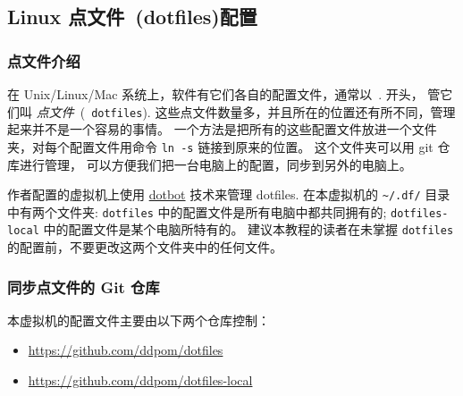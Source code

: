 \documentclass[
    11pt,
    base=hide,
    cite=authoryear,
    device=phone,
    lang=cn,
    mode=simple,
    result=answer,
    toc=onecol,
]{elegantbook_sierxue}
\begin{document}


\subsection{Linux 点文件~(dotfiles)配置}%
\label{sub:dotfiles-settings}

\subsubsection{点文件介绍}%
\label{ssub:dotfiles-settings-intro}

在 Unix/Linux/Mac 系统上，软件有它们各自的配置文件，通常以~. 开头，
管它们叫 \emph{点文件}~(~\texttt{dotfiles}).
这些点文件数量多，并且所在的位置还有所不同，管理起来并不是一个容易的事情。
一个方法是把所有的这些配置文件放进一个文件夹，对每个配置文件用命令
\lstinline{ln -s} 链接到原来的位置。
这个文件夹可以用 git 仓库进行管理，
可以方便我们把一台电脑上的配置，同步到另外的电脑上。

作者配置的虚拟机上使用
\href{https://github.com/anishathalye/dotbot}{dotbot} 技术来管理 dotfiles.
在本虚拟机的 \lstinline{~/.df/} 目录中有两个文件夹: \lstinline{dotfiles}
中的配置文件是所有电脑中都共同拥有的; \lstinline{dotfiles-local}
中的配置文件是某个电脑所特有的。
建议本教程的读者在未掌握 \lstinline{dotfiles}
的配置前，不要更改这两个文件夹中的任何文件。


\subsubsection{同步点文件的 Git 仓库}%
\label{ssub:vbox-guest-ganx-conf}

本虚拟机的配置文件主要由以下两个仓库控制：
\begin{itemize}
    \item \href{https://github.com/ddpom/dotfiles}
        {https://github.com/ddpom/dotfiles}
    \item \href{https://github.com/ddpom/dotfiles-local}
        {https://github.com/ddpom/dotfiles-local}
\end{itemize}
\end{document}
